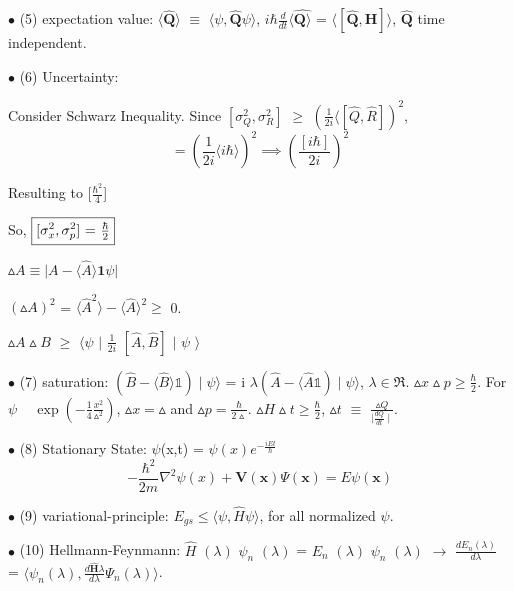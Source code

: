 \documentclass[a4paper, 10pt, onepage]{elegantbook}
\begin{document}
{$\bullet$ (5) expectation value:  
$\langle\hat{\mathbf Q} \rangle$ $\equiv$ $\langle\psi,  
\hat{\mathbf Q}\psi \rangle$, $i \hbar \frac{d}{dt} \langle \hat{\mathbf Q \rangle}$ = $\langle[ \hat{\mathbf 
Q},{\mathbf H}] \rangle$,
$\hat{\mathbf Q}$ time independent.  

$\bullet$ (6) Uncertainty:  

Consider Schwarz Inequality. Since $[\sigma^2_Q, \sigma^2_R]$ $\geq$ $(\frac{1}{2i} \langle [\hat{Q}, \hat{R}])^2$,
\begin{equation}
[\sigma^2_x, \sigma^2_p] = (\frac{1}{2i} \langle i \hbar \rangle)^2 \implies (\frac{[i \hbar]}{2i})^2
\end{equation}

 Resulting to [$\frac{\hbar^2}{4}$] 

So, $\boxed{[\sigma^2_x, \sigma^2_p$] = $\frac{\hbar}{2}}$  

$\vartriangle{A} \equiv \vert {A} - \langle \hat{A} \rangle \mathbf{1} \psi \vert$  

$(\vartriangle{A})^2$ = $\langle \hat{A}^2 \rangle - \langle \hat{A} \rangle^2 \geq$ 0.  

$\vartriangle{A} \vartriangle{B}$ $\geq$ $\langle \psi$ \quad $\mid$ $\frac{1}{2i}$ $[\hat{A},\hat{B}]$ \quad $\mid$ 
$\psi$ $\rangle$  

$\bullet$ (7) saturation: $(\hat{B} - \langle \hat{B} \rangle \mathbb1) \mid \psi \rangle$ = i 
$\lambda (\hat{A} - \langle \hat{A} \mathbb1)\mid \psi \rangle$, $\lambda \in \Re$.  
$\vartriangle{x} \vartriangle{p} \geq \frac{\hbar}{2}$. For $\psi$ ~ $\exp(- \frac{1}{4} \frac{x^2}{\vartriangle^2})$, 
$\vartriangle{x} = \vartriangle$ and $\vartriangle{p} = \frac{\hbar}{2 \vartriangle}$. 
$\vartriangle{H} \vartriangle{t} \geq \frac{\hbar}{2}$, $\vartriangle{t}$ $\equiv$ $\frac{\vartriangle Q } {\mid 
\frac{d Q}{dt} \mid}$.  

$\bullet$ (8) Stationary State: $\psi$(x,t) = $\psi (x)e^{- \frac{iEt}{\hbar}}$  
\begin{equation}
- \frac{\hbar^2}{2m} \nabla^2 \psi(x) + \mathbf V(\mathbf x) \Psi(\mathbf x) = E \psi(\mathbf x)
\end{equation}

$\bullet$ (9) variational-principle: $E_{gs} \leq \langle \psi, \hat{H} \psi \rangle$, for 
all normalized $\psi$. 

$\bullet$ (10) Hellmann-Feynmann: $\hat{H}$ $(\lambda)$ $\psi_n$ $(\lambda)$ = $E_n$ $(\lambda)$ $\psi_n$ $(\lambda)$ 
$\longrightarrow$ $\frac{dE_n (\lambda) } {d \lambda} $ = $\langle \psi_n (\lambda), \frac{d \hat{\mathbf H}{\lambda}} 
{d \lambda} \Psi_n(\lambda) \rangle$.  

}
\end{document}
